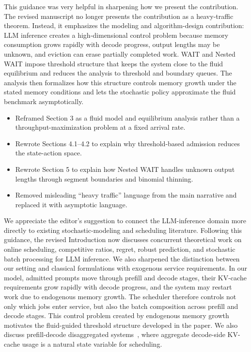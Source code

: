 
\response This guidance was very helpful in sharpening how we present the contribution. The revised manuscript no longer presents the contribution as a heavy-traffic theorem. Instead, it emphasizes the modeling and algorithm-design contribution: LLM inference creates a high-dimensional control problem because memory consumption grows rapidly with decode progress, output lengths may be unknown, and eviction can erase partially completed work. WAIT and Nested WAIT impose threshold structure that keeps the system close to the fluid equilibrium and reduces the analysis to threshold and boundary queues. The analysis then formalizes how this structure controls memory growth under the stated memory conditions and lets the stochastic policy approximate the fluid benchmark asymptotically.

\changes
\begin{itemize}
    \item Reframed Section 3 as a fluid model and equilibrium analysis rather than a throughput-maximization problem at a fixed arrival rate.
    \item Rewrote Sections 4.1--4.2 to explain why threshold-based admission reduces the state-action space.
    \item Rewrote Section 5 to explain how Nested WAIT handles unknown output lengths through segment boundaries and binomial thinning.
    \item Removed misleading ``heavy traffic'' language from the main narrative and replaced it with asymptotic language.
\end{itemize}


\response We appreciate the editor's suggestion to connect the LLM-inference domain more directly to existing stochastic-modeling and scheduling literature. Following this guidance, the revised Introduction now discusses concurrent theoretical work on online scheduling, competitive ratios, regret, robust prediction, and stochastic batch processing for LLM inference. We also sharpened the distinction between our setting and classical formulations with exogenous service requirements. In our model, admitted prompts move through prefill and decode stages, their KV-cache requirements grow rapidly with decode progress, and the system may restart work due to endogenous memory growth. The scheduler therefore controls not only which jobs enter service, but also the batch composition across prefill and decode stages. This control problem created by endogenous memory growth motivates the fluid-guided threshold structure developed in the paper. We also discuss prefill-decode disaggregated systems~\citep{patel2024splitwise,zhong2024distserve}, where aggregate decode-side KV-cache usage is a natural state variable for scheduling.

